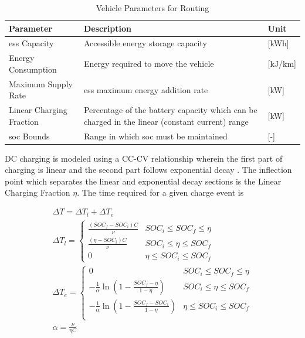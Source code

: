 \begin{table}[H]
	\centering
	\caption{Vehicle Parameters for Routing}
	\label{tab:param_veh}
	\begin{tabular}{|C{/8}|C{/8}|C{/8}|}
		\hline Parameter & Description & Unit \\
		\hline \gls{ess} Capacity & Accessible energy storage capacity & [kWh] \\
		\hline Energy Consumption & Energy required to move the vehicle & [kJ/km] \\
		\hline Maximum Supply Rate & \gls{ess} maximum energy addition rate & [kW] \\
		\hline Linear Charging Fraction & Percentage of the battery capacity which can be charged in the linear (constant current) range & [kW] \\
		\hline \gls{soc} Bounds & Range in which \gls{soc} must be maintained & [-] \\
		\hline
	\end{tabular}
\end{table}

DC charging is modeled using a CC-CV relationship wherein the first part of charging is linear and the second part follows exponential decay \cite{Marra_2012}. The inflection point which separates the linear and exponential decay sections is the Linear Charging Fraction $\eta$. The time required for a given charge event is

\begin{gather}
	\Delta T = \Delta T_{l} + \Delta T_{e} \\
	\Delta T_{l} = \begin{cases}
		\frac{(SOC_f - SOC_i) C}{\nu} &  SOC_i \leq SOC_f \leq \eta \\
		\frac{(\eta - SOC_i) C}{\nu} &  SOC_i \leq \eta \leq SOC_f \\
		0 &  \eta \leq SOC_i \leq SOC_f
	\end{cases} \\
	\Delta T_{e} = \begin{cases}
		0 & SOC_i \leq SOC_f \leq \eta \\
		-\frac{1}{\alpha}\ln{\left(1-\frac{SOC_f - \eta}{1-\eta}\right)} &  SOC_i \leq \eta \leq SOC_f \\
		-\frac{1}{\alpha}\ln{\left(1-\frac{SOC_f - SOC_i}{1-\eta}\right)} &  \eta \leq SOC_i \leq SOC_f \\
	\end{cases} \\
	\alpha = \frac{\nu}{\eta C}
\end{gather}

